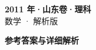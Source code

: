 \documentclass[zihao=-4, a4paper]{ctexart}
\begin{document}
\begin{center}
  {\Large\bfseries 2011 年·山东卷·理科}\\[4pt]
  {\large 数学 · 解析版}
\end{center}
\medskip
{}

\clearpage
{}
\begin{center}{\Large\bfseries 参考答案与详细解析}\end{center}
\medskip

\end{document}

